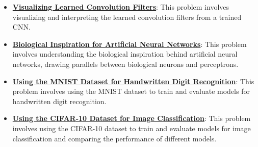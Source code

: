\documentclass{article}%
\begin{document}
\begin{itemize}[leftmargin=*]
\item \href{https://purdue.brightspace.com/d2l/common/assets/pdfjs-d2l-dist/1.0.14-legacy/web/viewer.html?file=%2Fcontent%2Fenforced%2F1095467-wl.202510.CS.24300.001%2F09L1-cnn.pdf%3Fou%3D1095467&lang=en-us&container=d2l-fileviewer-rendered-pdf&fullscreen=d2l-fileviewer-rendered-pdf-dialog&height=667#page=18}{\textbf{Visualizing Learned Convolution Filters}}: This problem involves visualizing and interpreting the learned convolution filters from a trained CNN.%
\item \href{https://purdue.brightspace.com/d2l/common/assets/pdfjs-d2l-dist/1.0.14-legacy/web/viewer.html?file=%2Fcontent%2Fenforced%2F1095467-wl.202510.CS.24300.001%2F09L1-cnn.pdf%3Fou%3D1095467&lang=en-us&container=d2l-fileviewer-rendered-pdf&fullscreen=d2l-fileviewer-rendered-pdf-dialog&height=667#page=20}{\textbf{Biological Inspiration for Artificial Neural Networks}}: This problem involves understanding the biological inspiration behind artificial neural networks, drawing parallels between biological neurons and perceptrons.%
\item \href{https://purdue.brightspace.com/d2l/common/assets/pdfjs-d2l-dist/1.0.14-legacy/web/viewer.html?file=%2Fcontent%2Fenforced%2F1095467-wl.202510.CS.24300.001%2F09L1-cnn.pdf%3Fou%3D1095467&lang=en-us&container=d2l-fileviewer-rendered-pdf&fullscreen=d2l-fileviewer-rendered-pdf-dialog&height=667#page=21}{\textbf{Using the MNIST Dataset for Handwritten Digit Recognition}}: This problem involves using the MNIST dataset to train and evaluate models for handwritten digit recognition.%
\item \href{https://purdue.brightspace.com/d2l/common/assets/pdfjs-d2l-dist/1.0.14-legacy/web/viewer.html?file=%2Fcontent%2Fenforced%2F1095467-wl.202510.CS.24300.001%2F09L1-cnn.pdf%3Fou%3D1095467&lang=en-us&container=d2l-fileviewer-rendered-pdf&fullscreen=d2l-fileviewer-rendered-pdf-dialog&height=667#page=23}{\textbf{Using the CIFAR{-}10 Dataset for Image Classification}}: This problem involves using the CIFAR-10 dataset to train and evaluate models for image classification and comparing the performance of different models.%
\end{itemize}%
\end{document}
